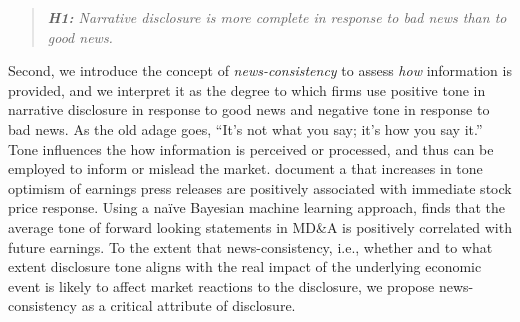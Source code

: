 \documentclass[letterpaper,12pt]{article}
\begin{document}
\begin{spacing}{1.5}
\begin{quote}
\textit{\textbf{H1:} Narrative disclosure is more complete in response to bad news than to good news.}
\end{quote}

Second, we introduce the concept of \textit{news-consistency} to assess \textit{how} information is provided, and we interpret it as the degree to which firms use positive tone in narrative disclosure in response to good news and negative tone in response to bad news. As the old adage goes, ``It's not what you say; it's how you say it.'' Tone influences the how information is perceived or processed, and thus can be employed to inform or mislead the market.  document a that increases in tone optimism of earnings press releases are positively associated with immediate stock price response. Using a naïve Bayesian machine learning approach,  finds that the average tone of forward looking statements in MD\&A is positively correlated with future earnings. To the extent that news-consistency, i.e., whether and to what extent disclosure tone aligns with the real impact of the underlying economic event is likely to affect market reactions to the disclosure, we propose news-consistency as a critical attribute of disclosure. 


\end{spacing}
\end{document}
